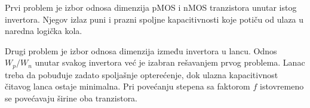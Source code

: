 Prvi problem je izbor odnosa dimenzija pMOS i nMOS tranzistora unutar istog invertora. Njegov izlaz puni i prazni spoljne kapacitivnosti koje potiču od ulaza u naredna logička kola.

Drugi problem je izbor odnosa dimenzija između invertora u lancu. Odnos $W_p/W_n$ unutar svakog invertora već je izabran rešavanjem prvog problema. Lanac treba da pobuđuje zadato spoljašnje opterećenje, dok ulazna kapacitivnost čitavog lanca ostaje minimalna. Pri povećanju stepena sa faktorom $f$ istovremeno se povećavaju širine oba tranzistora.
